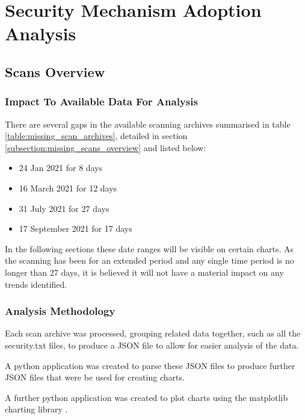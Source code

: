\documentclass{mscreport}
\begin{document}
\chapter{Security Mechanism Adoption Analysis}
\label{chap:analysis}

\section{Scans Overview}
\label{section:scans_overview}

\subsection{Impact To Available Data For Analysis}
\label{subsec:dataimpact}

There are several gaps in the available scanning archives summarised in table \ref{table:missing_scan_archives}, detailed in section \ref{subsection:missing_scans_overview} and listed below:

\begin{itemize}
	\setlength\itemsep{0.1em}
    \item 24 Jan 2021 for 8 days
    \item 16 March 2021 for 12 days
    \item 31 July 2021 for 27 days
    \item 17 September 2021 for 17 days
\end{itemize}

\noindent
In the following sections these date ranges will be visible on certain charts. As the scanning has been for an extended period and any single time period is no longer than 27 days, it is believed it will not have a material impact on any trends identified.


\subsection{Analysis Methodology}

Each scan archive was processed, grouping related data together, such as all the security.txt files, to produce a JSON file to allow for easier analysis of the data.

\vspace{0.3cm} \noindent
A python application was created to parse these JSON files to produce further JSON files that were be used for creating charts.

\vspace{0.3cm} \noindent
A further python application was created to plot charts using the matplotlib charting library \cite{noauthor_undated-po}.
\end{document}
